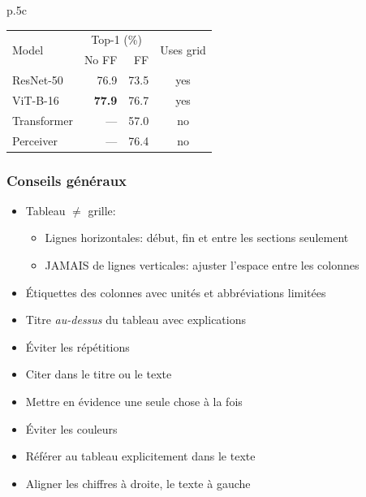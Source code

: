 \documentclass[aspectratio=169]{beamer}
\begin{document}
\begin{frame}[c]
\begin{tabular}{p{}c}
\begin{minipage}{.4\textwidth}
\begin{table}
\vspace{3pt}
\begin{tabular}{l@{\hskip5pt}r@{\hskip10pt}r@{\hskip5pt}c}
\toprule
\multirow{2}{*}[-2pt]{Model} & \multicolumn{2}{c}{Top\hspace{1pt}-\hspace{-1.08pt}1 (\%)} & \multirow{2}{*}[-2pt]{Uses grid}\\
\cmidrule(r){2-3}
 & No FF & FF & \\
\midrule
ResNet-50 & 76.9 & 73.5 & yes\\
ViT-B-16 & \textbf{77.9} & 76.7 & yes\\
Transformer & --- & 57.0 & no\\
Perceiver & --- & 76.4 & no\\
\bottomrule
\end{tabular}
\end{table}
\end{minipage}

\end{tabular}



\end{frame}


\begin{frame}[c]\frametitle{Conseils généraux}

\vspace{-4mm}

\begin{itemize}
	\item Tableau $\ne$ grille:
	\begin{itemize}
		\item Lignes horizontales: début, fin et entre les sections seulement
		\item JAMAIS de lignes verticales: ajuster l'espace entre les colonnes
	\end{itemize}
	\vspace{-3mm}
	\item Étiquettes des colonnes avec unités et abbréviations limitées
	\item Titre \textit{au-dessus} du tableau avec explications
	\item Éviter les répétitions
	\item Citer dans le titre ou le texte
	\item Mettre en évidence une seule chose à la fois
	\item Éviter les couleurs
	\item Référer au tableau explicitement dans le texte
	\item Aligner les chiffres à droite, le texte à gauche
\end{itemize}

\end{frame}
\end{document}
